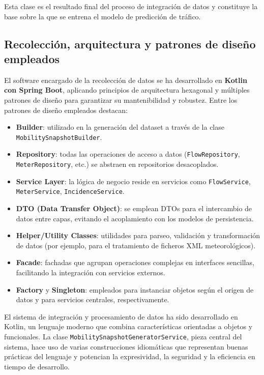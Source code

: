 Esta clase es el resultado final del proceso de integración de datos y constituye la base sobre la que se entrena el modelo de predicción de tráfico.

\subsection{Recolección, arquitectura y patrones de diseño empleados}

El software encargado de la recolección de datos se ha desarrollado en \textbf{Kotlin con Spring Boot}, aplicando principios de arquitectura hexagonal y múltiples patrones de diseño para garantizar su mantenibilidad y robustez. Entre los patrones de diseño empleados destacan:

\begin{itemize}
	\item \textbf{Builder}: utilizado en la generación del dataset a través de la clase \texttt{MobilitySnapshotBuilder}.
	\item \textbf{Repository}: todas las operaciones de acceso a datos (\texttt{FlowRepository}, \texttt{MeterRepository}, etc.) se abstraen en repositorios desacoplados.
	\item \textbf{Service Layer}: la lógica de negocio reside en servicios como \texttt{FlowService}, \texttt{MeterService}, \texttt{IncidenceService}.
	\item \textbf{DTO (Data Transfer Object)}: se emplean DTOs para el intercambio de datos entre capas, evitando el acoplamiento con los modelos de persistencia.
	\item \textbf{Helper/Utility Classes}: utilidades para parseo, validación y transformación de datos (por ejemplo, para el tratamiento de ficheros XML meteorológicos).
	\item \textbf{Facade}: fachadas que agrupan operaciones complejas en interfaces sencillas, facilitando la integración con servicios externos.
	\item \textbf{Factory} y \textbf{Singleton}: empleados para instanciar objetos según el origen de datos y para servicios centrales, respectivamente.
\end{itemize}

El sistema de integración y procesamiento de datos ha sido desarrollado en Kotlin, un lenguaje moderno que combina características orientadas a objetos y funcionales. La clase \texttt{MobilitySnapshotGeneratorService}, pieza central del sistema, hace uso de varias construcciones idiomáticas que representan buenas prácticas del lenguaje y potencian la expresividad, la seguridad y la eficiencia en tiempo de desarrollo.

